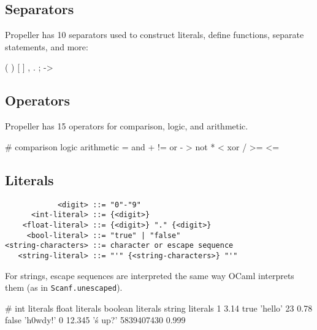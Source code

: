 \subsection{Separators}
Propeller has 10 separators used to construct literals, define functions, separate statements, and
more:
\begin{mylistingn}
( ) [ ] { }
, . ;   ->
\end{mylistingn}

\clearpage

\subsection{Operators}
Propeller has 15 operators for comparison, logic, and arithmetic.
\begin{mylistingn}
# comparison  logic  arithmetic
  =           and    +
  !=          or     -
  >           not    *
  <           xor    /
  >=                 %
  <=
\end{mylistingn}

\subsection{Literals}
\begin{verbatim}
            <digit> ::= "0"-"9"
      <int-literal> ::= {<digit>}
    <float-literal> ::= {<digit>} "." {<digit>}
     <bool-literal> ::= "true" | "false"
<string-characters> ::= character or escape sequence
   <string-literal> ::= "'" {<string-characters>} "'"
\end{verbatim}

For strings, escape sequences are interpreted the same way OCaml interprets them (as in
\verb|Scanf.unescaped|).

\begin{mylistingn}
# int literals     float literals     boolean literals       string literals
1                  3.14               true                   'hello'
23                 0.78               false                  'h0wdy!'
0                  12.345                                    '\twhat\'s up?\n'
5839407430         0.999
\end{mylistingn}

